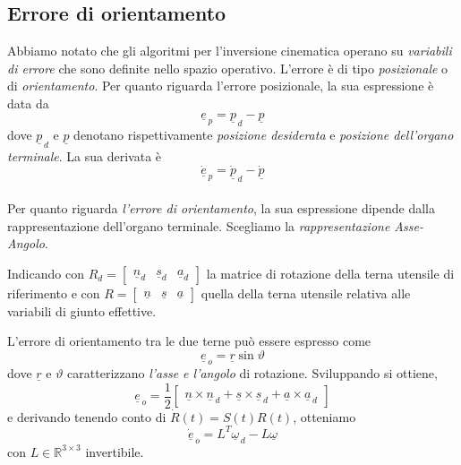 \subsection{Errore di orientamento}
Abbiamo notato che gli algoritmi per l'inversione cinematica operano su \emph{variabili di errore} che sono definite nello spazio operativo. L'errore è di tipo \emph{posizionale} o di \emph{orientamento}. Per quanto riguarda l'errore posizionale, la sua espressione è data da
\begin{equation}
	\underline{e}_{\,p} = \underline{p}_{\,d} - \underline{p}
\end{equation} 
dove $\underline{p}_{\,d}$ e $\underline{p}$ denotano rispettivamente \emph{posizione desiderata} e \emph{posizione dell'organo terminale}. La sua derivata è
\begin{equation}
	\underline{\dot{e}}_{\,p} = \underline{\dot{p}}_{\,d} - \underline{\dot{p}}
\end{equation}

\paragraph{}
Per quanto riguarda \emph{l'errore di orientamento}, la sua espressione dipende dalla rappresentazione dell'organo terminale. Scegliamo la \emph{rappresentazione Asse-Angolo}.

Indicando con  
$R_d = 
\begin{bmatrix}
	\underline{n}_d & \underline{s}_d & \underline{a}_d
\end{bmatrix}$ la matrice di rotazione della terna utensile di riferimento e con 
$R =
\begin{bmatrix}
	\underline{n} & \underline{s} & \underline{a}
\end{bmatrix}$ quella della terna utensile relativa alle variabili di giunto effettive. 

L'errore di orientamento tra le due terne può essere espresso come
\begin{equation}
	\underline{e}_{\,o} = \underline{r}\sin\vartheta
\end{equation}
dove $\underline{r}$ e $\vartheta$ caratterizzano \emph{l'asse e l'angolo} di rotazione. Sviluppando si ottiene,
\begin{equation}
	\underline{e}_{\,o} = \frac{1}{2}
	\begin{bmatrix}
		\underline{n} \times \underline{n}_{\,d} + \underline{s} \times \underline{s}_{\,d} + \underline{a} \times \underline{a}_{\,d}
	\end{bmatrix}
\end{equation}
e derivando tenendo conto di $\dot{R}(t) = S(t)R(t)$, otteniamo
\begin{equation}
	\underline{\dot{e}}_{\,o} = L^T\underline{\omega}_{\,d} - L\underline{\omega}
\end{equation}
con $L \in \mathbb{R}^{3 \times 3}$ invertibile.

